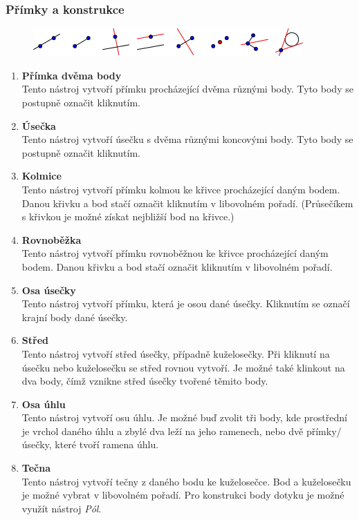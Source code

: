 \documentclass[11pt]{article}
\begin{document}
    \subsubsection{Přímky a konstrukce}
    \vspace{-10pt}
    \begin{figure}[h]
        \begin{center}
        \includegraphics[scale=0.5]{imgs/line_tools.png}
        \end{center}
    \end{figure}
    \vspace{-25pt}
    \begin{enumerate}
        \item{\bf Přímka dvěma body}\\
        Tento nástroj vytvoří přímku procházející dvěma různými body. Tyto body se postupně označit kliknutím.
        \item{\bf Úsečka}\\
        Tento nástroj vytvoří úsečku s dvěma různými koncovými body. Tyto body se postupně označit kliknutím.
        \item{\bf Kolmice}\\
        Tento nástroj vytvoří přímku kolmou ke křivce procházející daným bodem. Danou křivku a bod stačí označit kliknutím v libovolném pořadí. (Průsečíkem s křivkou je možné získat nejbližší bod na křivce.)
        \item{\bf Rovnoběžka}\\
        Tento nástroj vytvoří přímku rovnoběžnou ke křivce procházející daným bodem. Danou křivku a bod stačí označit kliknutím v libovolném pořadí.
        \item{\bf Osa úsečky}\\
        Tento nástroj vytvoří přímku, která je osou dané úsečky. Kliknutím se označí krajní body dané úsečky.
        \item{\bf Střed}\\
        Tento nástroj vytvoří střed úsečky, případně kuželosečky. Při kliknutí na úsečku nebo kuželosečku se střed rovnou vytvoří. Je možné také klinkout na dva body, čímž vznikne střed úsečky tvořené těmito body.
        \item{\bf Osa úhlu}\\
        Tento nástroj vytvoří osu úhlu. Je možné buď zvolit tři body, kde prostřední je vrchol daného úhlu a zbylé dva leží na jeho ramenech, nebo dvě přímky/úsečky, které tvoří ramena úhlu.
        \item{\bf Tečna}\\
        Tento nástroj vytvoří tečny z daného bodu ke kuželosečce. Bod a kuželosečku je možné vybrat v libovolném pořadí. Pro konstrukci body dotyku je možné využít nástroj \textit{Pól}.
    \end{enumerate}
\end{document}
